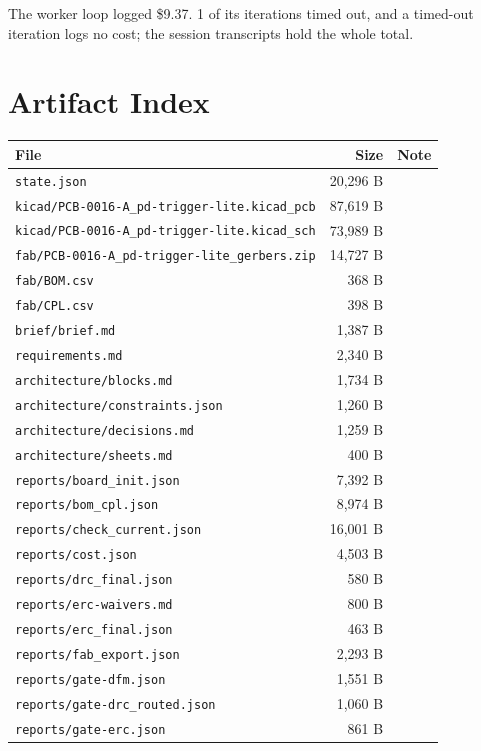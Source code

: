 \documentclass[11pt,a4paper]{article}
\begin{document}
The worker loop logged \$9.37. 1 of its iterations timed out, and a timed-out iteration logs no cost; the session transcripts hold the whole total.

\section{Artifact Index}
{\small
\begin{longtable}{p{9cm}rp{4cm}}
\toprule
\textbf{File} & \textbf{Size} & \textbf{Note} \\
\midrule
\endhead
\texttt{state.json} & 20,296 B &  \\
\texttt{kicad/PCB-0016-A\_pd-trigger-lite.kicad\_pcb} & 87,619 B &  \\
\texttt{kicad/PCB-0016-A\_pd-trigger-lite.kicad\_sch} & 73,989 B &  \\
\texttt{fab/PCB-0016-A\_pd-trigger-lite\_gerbers.zip} & 14,727 B &  \\
\texttt{fab/BOM.csv} & 368 B &  \\
\texttt{fab/CPL.csv} & 398 B &  \\
\texttt{brief/brief.md} & 1,387 B &  \\
\texttt{requirements.md} & 2,340 B &  \\
\texttt{architecture/blocks.md} & 1,734 B &  \\
\texttt{architecture/constraints.json} & 1,260 B &  \\
\texttt{architecture/decisions.md} & 1,259 B &  \\
\texttt{architecture/sheets.md} & 400 B &  \\
\texttt{reports/board\_init.json} & 7,392 B &  \\
\texttt{reports/bom\_cpl.json} & 8,974 B &  \\
\texttt{reports/check\_current.json} & 16,001 B &  \\
\texttt{reports/cost.json} & 4,503 B &  \\
\texttt{reports/drc\_final.json} & 580 B &  \\
\texttt{reports/erc-waivers.md} & 800 B &  \\
\texttt{reports/erc\_final.json} & 463 B &  \\
\texttt{reports/fab\_export.json} & 2,293 B &  \\
\texttt{reports/gate-dfm.json} & 1,551 B &  \\
\texttt{reports/gate-drc\_routed.json} & 1,060 B &  \\
\texttt{reports/gate-erc.json} & 861 B &  \\

\end{longtable}}
\end{document}
